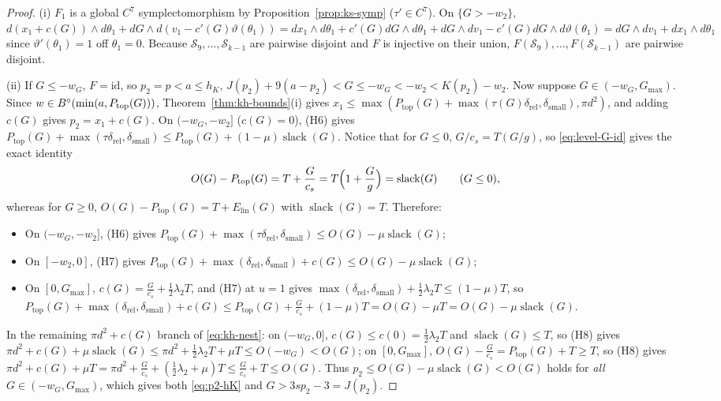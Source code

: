 \begin{proof}
(i) $F_1$ is a global $C^7$ symplectomorphism by Proposition~\ref{prop:ks-symp} ($\tau'\in C^7$). On $\{G>-w_2\}$,
$d(x_1+c(G))\wedge d\theta_1 + dG\wedge d(v_1-c'(G)\vartheta(\theta_1))
=dx_1\wedge d\theta_1+c'(G)dG\wedge d\theta_1+dG\wedge dv_1-c'(G)dG\wedge d\vartheta(\theta_1)=dG\wedge dv_1+dx_1\wedge d\theta_1$
since $\vartheta'(\theta_1)=1$ off $\theta_1=0$. Because $\mathcal S_9,\dots,\mathcal S_{k-1}$ are pairwise disjoint and
$F$ is injective on their union, $F(\mathcal S_9),\dots,F(\mathcal S_{k-1})$ are pairwise disjoint.

(ii) If $G\le-w_G$, $F=\mathrm{id}$, so $p_2=p<a\le h_K$, $J(p_2)+9(a-p_2)<G\le-w_G<-w_2<K(p_2)-w_2$.
Now suppose $G\in(-w_G,G_{\max})$. Since $w\in B^{\circ}(\min(a,P_{\mathrm{top}}(G)))$, Theorem~\ref{thm:kh-bounds}(i) gives
$x_1\le\max(P_{\mathrm{top}}(G)+\max(\tau(G)\delta_{\mathrm{rel}},\delta_{\mathrm{small}}),\pi d^2)$, and adding $c(G)$
gives $p_2=x_1+c(G)$.
On $(-w_G,-w_2]$ ($c(G)=0$), (H6) gives $P_{\mathrm{top}}(G)+\max(\tau\delta_{\mathrm{rel}},\delta_{\mathrm{small}})
\le P_{\mathrm{top}}(G)+(1-\mu)\operatorname{slack}(G)$. Notice that for $G\le0$, $G/c_s=T(G/g)$, so \eqref{eq:level-G-id}
gives the exact identity
\[
 O(G)-P_{\mathrm{top}}(G) = T + \frac{G}{c_s} = T\Bigl(1+\frac{G}{g}\Bigr) = \operatorname{slack}(G)\qquad(G\le0),
\]
whereas for $G\ge0$, $O(G)-P_{\mathrm{top}}(G)=T+E_{\mathrm{lin}}(G)$ with $\operatorname{slack}(G)=T$. Therefore:
\begin{itemize}
\item On $(-w_G,-w_2]$, (H6) gives $P_{\mathrm{top}}(G)+\max(\tau\delta_{\mathrm{rel}},\delta_{\mathrm{small}})\le O(G)-\mu\operatorname{slack}(G)$;
\item On $[-w_2,0]$, (H7) gives $P_{\mathrm{top}}(G)+\max(\delta_{\mathrm{rel}},\delta_{\mathrm{small}})+c(G)\le O(G)-\mu\operatorname{slack}(G)$;
\item On $[0,G_{\max}]$, $c(G)=\frac{G}{c_s}+\frac12\lambda_2 T$, and (H7) at $u=1$ gives
$\max(\delta_{\mathrm{rel}},\delta_{\mathrm{small}})+\frac12\lambda_2 T\le(1-\mu)T$, so
$P_{\mathrm{top}}(G)+\max(\delta_{\mathrm{rel}},\delta_{\mathrm{small}})+c(G)\le P_{\mathrm{top}}(G)+\frac{G}{c_s}+(1-\mu)T=O(G)-\mu T=O(G)-\mu\operatorname{slack}(G)$.
\end{itemize}
In the remaining $\pi d^2+c(G)$ branch of \eqref{eq:kh-nest}: on $(-w_G,0]$, $c(G)\le c(0)=\frac12\lambda_2 T$ and
$\operatorname{slack}(G)\le T$, so (H8) gives $\pi d^2+c(G)+\mu\operatorname{slack}(G)\le\pi d^2+\frac12\lambda_2 T+\mu T\le O(-w_G)<O(G)$;
on $[0,G_{\max}]$, $O(G)-\frac{G}{c_s}=P_{\mathrm{top}}(G)+T\ge T$, so (H8) gives
$\pi d^2+c(G)+\mu T=\pi d^2+\frac{G}{c_s}+(\frac12\lambda_2+\mu)T\le\frac{G}{c_s}+T\le O(G)$.
Thus $p_2\le O(G)-\mu\operatorname{slack}(G)<O(G)$ holds for \emph{all} $G\in(-w_G,G_{\max})$, which gives both
\eqref{eq:p2-hK} and $G>3sp_2-3=J(p_2)$.


\end{proof}
